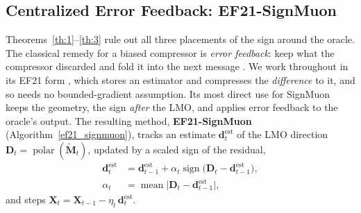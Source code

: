 \subsection{Centralized Error Feedback: EF21-SignMuon}

Theorems~\ref{th:1}--\ref{th:3} rule out all three placements of the sign around the oracle. The classical remedy for a biased compressor is \emph{error feedback}: keep what the compressor discarded and fold it into the next message \citep{seide20141bit,karimireddy2019efsign}. We work throughout in its EF21 form \citep{richtarik2021ef21}, which stores an estimator and compresses the \emph{difference} to it, and so needs no bounded-gradient assumption. Its most direct use for SignMuon keeps the geometry, the sign \emph{after} the LMO, and applies error feedback to the oracle's output. The resulting method, \textbf{EF21-SignMuon} (Algorithm~\ref{ef21_signmuon}), tracks an estimate $\mathbf{d}_t^{\mathrm{est}}$ of the LMO direction $\mathbf{D}_t=\operatorname{polar}(\tilde{\mathbf{M}}_t)$, updated by a scaled sign of the residual,
\begin{equation}\label{eq:efsm_est}
\begin{aligned}
\mathbf{d}_t^{\mathrm{est}}&=\mathbf{d}_{t-1}^{\mathrm{est}}+\alpha_t\operatorname{sign}\!\bigl(\mathbf{D}_t-\mathbf{d}_{t-1}^{\mathrm{est}}\bigr),\\
\alpha_t&=\operatorname{mean}\bigl|\mathbf{D}_t-\mathbf{d}_{t-1}^{\mathrm{est}}\bigr|,
\end{aligned}
\end{equation}
and steps $\mathbf{X}_t=\mathbf{X}_{t-1}-\eta_t\,\mathbf{d}_t^{\mathrm{est}}$.

